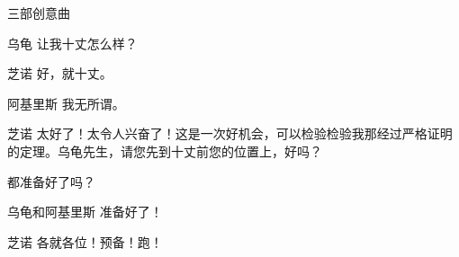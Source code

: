\begin{dialog}{三部创意曲}
\begin{dialogue}
\item[乌龟]让我十丈怎么样？

\item[芝诺]好，就十丈。

\item[阿基里斯]我无所谓。

\item[芝诺]太好了！太令人兴奋了！这是一次好机会，可以检验检验我那经过严格证明的定理。乌龟先生，请您先到十丈前您的位置上，好吗？


都准备好了吗？

\item[乌龟和阿基里斯]准备好了！

\item[芝诺]各就各位！预备！跑！

\end{dialogue}

\end{dialog}
